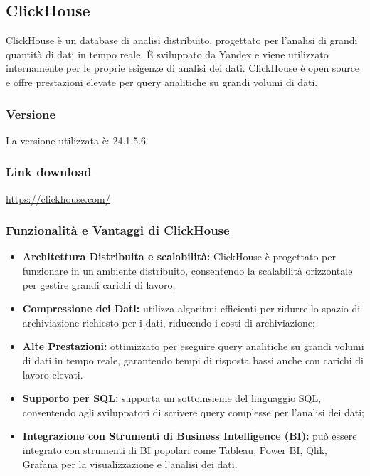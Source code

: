 \subsection{ClickHouse} \label{sec:clickHouse}
ClickHouse è un database di analisi distribuito, progettato per l'analisi di grandi quantità di dati in tempo reale. È sviluppato da Yandex e viene utilizzato internamente per le proprie esigenze di analisi dei dati. ClickHouse è open source e offre prestazioni elevate per query analitiche su grandi volumi di dati.
\subsubsection{Versione}
La versione utilizzata è: 24.1.5.6
\subsubsection{Link download}
\href{https://clickhouse.com/}{https://clickhouse.com/}

\subsubsection*{Funzionalità e Vantaggi di ClickHouse}
\begin{itemize}
    \item \textbf{Architettura Distribuita e scalabilità:} ClickHouse è progettato per funzionare in un ambiente distribuito, consentendo la scalabilità orizzontale per gestire grandi carichi di lavoro;
    \item \textbf{Compressione dei Dati:} utilizza algoritmi efficienti per ridurre lo spazio di archiviazione richiesto per i dati, riducendo i costi di archiviazione;
    \item \textbf{Alte Prestazioni:} ottimizzato per eseguire query analitiche su grandi volumi di dati in tempo reale, garantendo tempi di risposta bassi anche con carichi di lavoro elevati.
    \item \textbf{Supporto per SQL:} supporta un sottoinsieme del linguaggio SQL, consentendo agli sviluppatori di scrivere query complesse per l'analisi dei dati;
    \item \textbf{Integrazione con Strumenti di Business Intelligence (BI):} può essere integrato con strumenti di BI popolari come Tableau, Power BI, Qlik, Grafana per la visualizzazione e l'analisi dei dati.
\end{itemize}


